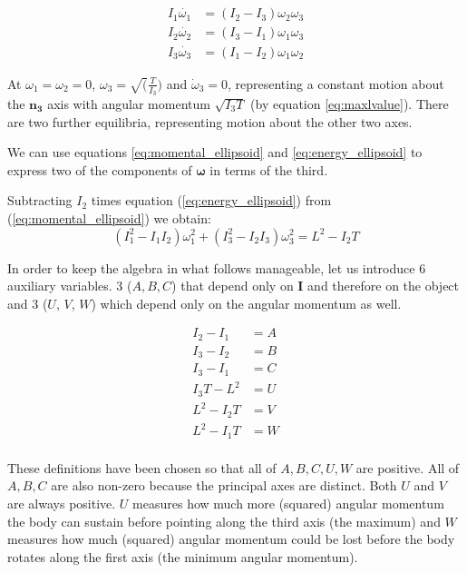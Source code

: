 \documentclass[a4paper, 12pt]{article}
\begin{document}
\begin{align}
  I_1\dot{\omega_1}& =(I_2 - I_3)\omega_2\omega_3 \label{eq:euler1} \\
  I_2\dot{\omega_2}& =(I_3 - I_1)\omega_1\omega_3 \\
  I_3\dot{\omega_3}& =(I_1 - I_2)\omega_1\omega_2 
\end{align}

At $\omega_1=\omega_2=0$, $\omega_3=\sqrt(\frac{T}{I_3})$ and $\dot\omega_3=0$, representing a constant motion about the $\bm{n_3}$ axis with angular momentum $\sqrt{I_3T}$ (by equation \ref{eq:maxlvalue}). There are two further equilibria, representing motion about the other two axes.



We can use equations \ref{eq:momental_ellipsoid} and \ref{eq:energy_ellipsoid} to express two of the components of $\boldsymbol{\omega}$ in terms of the third.

Subtracting $I_2$ times equation (\ref{eq:energy_ellipsoid}) from (\ref{eq:momental_ellipsoid}) we obtain:
\begin{equation}
  (I_1^2 - I_1I_2)\omega_1^2 + (I_3^2 - I_2I_3)\omega_3^2 = L^2 - I_2T \label{eq:omega13}
\end{equation}

In order to keep the algebra in what follows manageable, let us introduce 6 auxiliary variables. 3 ($A, B, C$) that depend only on $\bm{I}$ and therefore on the object and 3 ($U$, $V$, $W$) which depend only on the angular momentum as well.

\begin{align}
  I_2 - I_1 &= A \\
I_3 - I_2 &= B \\
I_3 - I_1 &= C \\
I_3T - L^2 &= U \\
L^2 - I_2 T &= V \\
L^2 - I_1 T &= W \\
\end{align}

These definitions have been chosen so that all of $A, B, C, U, W$ are positive. All of $A, B, C$ are also non-zero because the principal axes are distinct. Both $U$ and $V$ are always positive. $U$ measures how much more (squared) angular momentum the body can sustain before pointing along the third axis (the maximum) and $W$ measures how much (squared) angular momentum could be lost before the body rotates along the first axis (the minimum angular momentum).
\end{document}
